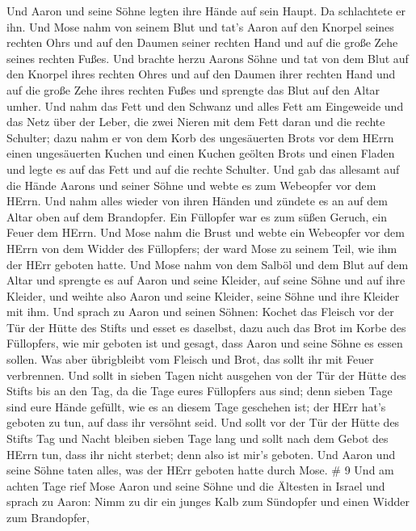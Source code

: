 Und Aaron und seine Söhne legten ihre Hände auf sein Haupt.
 Da schlachtete er ihn. Und Mose nahm von seinem Blut und
tat's Aaron auf den Knorpel seines rechten Ohrs und auf den Daumen
seiner rechten Hand und auf die große Zehe seines rechten Fußes.
 Und brachte herzu Aarons Söhne und tat von dem Blut auf
den Knorpel ihres rechten Ohres und auf den Daumen ihrer rechten Hand
und auf die große Zehe ihres rechten Fußes und sprengte das Blut auf den
Altar umher.  Und nahm das Fett und den Schwanz und alles
Fett am Eingeweide und das Netz über der Leber, die zwei Nieren mit dem
Fett daran und die rechte Schulter;  dazu nahm er von dem
Korb des ungesäuerten Brots vor dem HErrn einen ungesäuerten Kuchen und
einen Kuchen geölten Brots und einen Fladen und legte es auf das Fett
und auf die rechte Schulter.  Und gab das allesamt auf die
Hände Aarons und seiner Söhne und webte es zum Webeopfer vor dem HErrn.
 Und nahm alles wieder von ihren Händen und zündete es an
auf dem Altar oben auf dem Brandopfer. Ein Füllopfer war es zum süßen
Geruch, ein Feuer dem HErrn.  Und Mose nahm die Brust und
webte ein Webeopfer vor dem HErrn von dem Widder des Füllopfers; der
ward Mose zu seinem Teil, wie ihm der HErr geboten hatte. 
Und Mose nahm von dem Salböl und dem Blut auf dem Altar und sprengte es
auf Aaron und seine Kleider, auf seine Söhne und auf ihre Kleider, und
weihte also Aaron und seine Kleider, seine Söhne und ihre Kleider mit
ihm.  Und sprach zu Aaron und seinen Söhnen: Kochet das
Fleisch vor der Tür der Hütte des Stifts und esset es daselbst, dazu
auch das Brot im Korbe des Füllopfers, wie mir geboten ist und gesagt,
dass Aaron und seine Söhne es essen sollen.  Was aber
übrigbleibt vom Fleisch und Brot, das sollt ihr mit Feuer verbrennen.
 Und sollt in sieben Tagen nicht ausgehen von der Tür der
Hütte des Stifts bis an den Tag, da die Tage eures Füllopfers aus sind;
denn sieben Tage sind eure Hände gefüllt,  wie es an diesem
Tage geschehen ist; der HErr hat's geboten zu tun, auf dass ihr versöhnt
seid.  Und sollt vor der Tür der Hütte des Stifts Tag und
Nacht bleiben sieben Tage lang und sollt nach dem Gebot des HErrn tun,
dass ihr nicht sterbet; denn also ist mir's geboten.  Und
Aaron und seine Söhne taten alles, was der HErr geboten hatte durch
Mose. \# 9  Und am achten Tage rief Mose Aaron und seine
Söhne und die Ältesten in Israel  und sprach zu Aaron: Nimm
zu dir ein junges Kalb zum Sündopfer und einen Widder zum Brandopfer,
